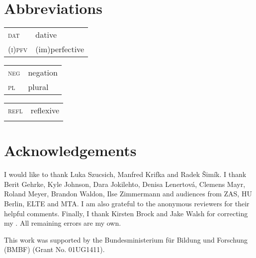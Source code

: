 \documentclass[output=paper,  modfonts,  newtxmath,  hidelinks		  ]{langscibook}
\begin{document}
\section*{Abbreviations}
\begin{tabularx}{.333\textwidth}{@{}lQ@{}}
\textsc{dat} & {dative} \\
\textsc{(i)pfv} & (im){perfective}\\
\end{tabularx}%
\begin{tabularx}{.333\textwidth}{@{}lQ@{}}
\textsc{neg} & {negation}\\
\textsc{pl}&{plural}\\
\end{tabularx}%
\begin{tabularx}{.333\textwidth}{@{}lQ@{}}
\textsc{refl}&reflexive\\
{}&{}\\
\end{tabularx}

 \section*{Acknowledgements}
I would like to thank Luka Szucsich, Manfred Krifka and Radek \v{S}imík. I thank Berit Gehrke, Kyle Johnson, Dara Jokilehto, Denisa Lenertová, Clemens Mayr, Roland Meyer, Brandon Waldon, Ilse Zimmermann and audiences from ZAS, HU Berlin, ELTE and MTA. I am also grateful to the anonymous reviewers for their helpful comments. Finally, I thank Kirsten Brock and Jake Walsh for correcting my . All remaining errors are my own.

This work was supported by the  Bundesministerium für Bildung und Forschung (BMBF) (Grant No. 01UG1411).

\sloppy
\printbibliography[heading=subbibliography,notkeyword=this]
\end{document}
